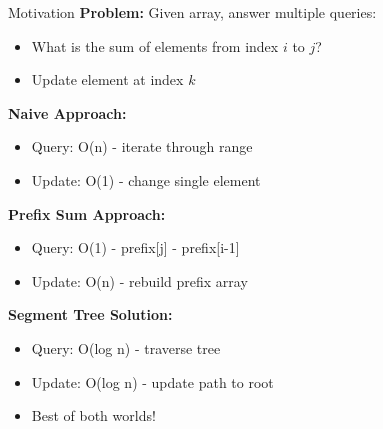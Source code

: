 \documentclass[aspectratio=169]{beamer}
\begin{document}
\begin{frame}{Motivation}
  \textbf{Problem:} Given array, answer multiple queries:
  \begin{itemize}
    \item What is the sum of elements from index $i$ to $j$?
    \item Update element at index $k$
  \end{itemize}

  \vspace{0.5cm}
  \textbf{Naive Approach:}
  \begin{itemize}
    \item Query: O(n) - iterate through range
    \item Update: O(1) - change single element
  \end{itemize}

  \vspace{0.5cm}
  \textbf{Prefix Sum Approach:}
  \begin{itemize}
    \item Query: O(1) - prefix[j] - prefix[i-1]
    \item Update: O(n) - rebuild prefix array
  \end{itemize}

  \vspace{0.5cm}
  \textbf{Segment Tree Solution:}
  \begin{itemize}
    \item Query: O(log n) - traverse tree
    \item Update: O(log n) - update path to root
    \item Best of both worlds!
  \end{itemize}
\end{frame}
\end{document}
